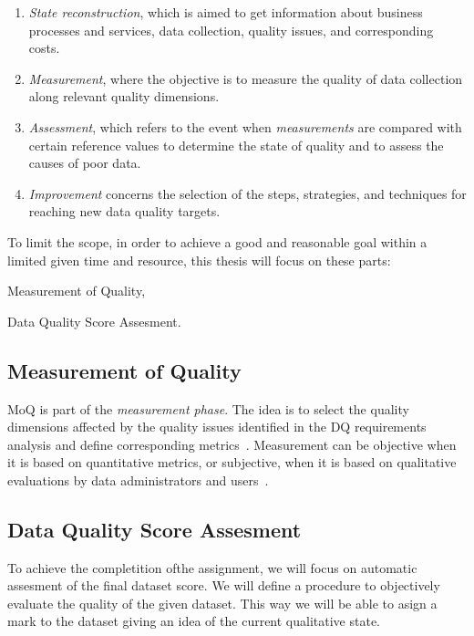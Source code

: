 \begin{enumerate}
    \item \textit{State reconstruction}, which is aimed to get information about business processes and services, data collection, quality issues, and corresponding costs.
    \item \textit{Measurement}, where the objective is to measure the quality of data collection along relevant quality dimensions.
    \item \textit{Assessment}, which refers to the event when \textit{measurements} are compared with certain reference values to determine the state of quality and to assess the causes of poor data.
    \item \textit{Improvement} concerns the selection of the steps, strategies, and techniques for reaching new data quality targets.
\end{enumerate}

To limit the scope, in order to achieve a good and reasonable goal within a limited given time and resource, this thesis will focus on these parts:
\begin{enumerate*}[label=(\roman*)]
    \item Measurement of Quality,
    \item Data Quality Score Assesment.
\end{enumerate*}

\subsection*{Measurement of Quality}

MoQ is part of the \textit{measurement phase}.
The idea is to select the quality dimensions affected by the quality issues identified in the DQ requirements analysis and define corresponding metrics~\cite{loshin2008}.
Measurement can be objective when it is based on quantitative metrics, or subjective, when it is based on qualitative evaluations by data administrators and users~\cite{loshin2008}.

\subsection*{Data Quality Score Assesment}

To achieve the completition ofthe assignment, we will focus on automatic assesment of the final dataset score.
We will define a procedure to objectively evaluate the quality of the given dataset.
This way we will be able to asign a mark to the dataset giving an idea of the current qualitative state.

